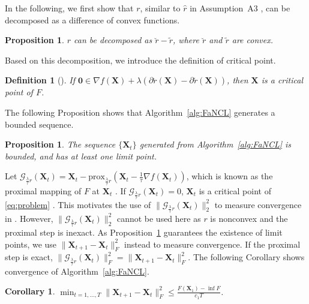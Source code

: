 \documentclass[10pt,journal,compsoc]{IEEEtran}
\newtheorem{prop}[theorem]{Proposition}
\newtheorem{corollary}[theorem]{Corollary}
\newtheorem{definition}{Definition}
\newcommand{\X}{\mathbf{X}}
\newcommand{\NM}[2]{\| #1 \|_{#2} }
\newcommand{\Prox}[2]{\text{prox}_{#1}(#2)}
\begin{document}
In the following, we first
show that $r$,
similar to $\hat{r}$ in Assumption~A3 \cite{gongZLHY2013},
can be decomposed as a difference of convex functions.

\begin{prop} \label{pr:dc}
$r$ can be decomposed as $\breve{r} - \tilde{r}$,
where $\breve{r}$ and $\tilde{r}$ are convex.
\end{prop}

Based on this decomposition, we introduce the definition of critical point.

\begin{definition}
[\!\cite{hiriart85}]
If $\mathbf{0} \in \nabla f(\X) + \lambda \left( \partial \breve{r}(\X) - \partial \tilde{r}(\X) \right) $,
then $\X$ is a {\em critical point} of $F$.
\label{def:crti}
\end{definition}


The following Proposition
shows that Algorithm~\ref{alg:FaNCL} generates a bounded sequence.

\begin{prop} \label{pr:boundseq}
The sequence $\{\X_t\}$ generated from Algorithm~\ref{alg:FaNCL} is bounded,
and has at least one limit point.
\end{prop}

Let $\mathcal{G}_{\frac{\lambda}{\tau} r}(\X_t) = \X_t - \Prox{\frac{\lambda}{\tau}r}{\X_t - \frac{1}{\tau} \nabla f(\X_t)}$,
which is known as the proximal mapping of $F$ at $\X_t$ \cite{parikh2014proximal}.
If $\mathcal{G}_{\frac{\lambda}{\tau} r}(\X_t) = 0$,
$\mathbf{X}_t$ is a critical point of \eqref{eq:problem}
\cite{attouch2013convergence,gongZLHY2013}.
This motivates the use of $\| \mathcal{G}_{\frac{\lambda}{\tau} r}(\X_t) \|_2^2$ to measure convergence 
in \cite{ghadimi2016accelerated}.
However, $\| \mathcal{G}_{\frac{\lambda}{\tau} r}(\X_t) \|_2^2$
cannot be used here as $r$ is nonconvex and the proximal step is inexact.
As 
Proposition~\ref{pr:boundseq}
guarantees
the existence of limit points,
we use $\NM{\X_{t + 1} - \X_t}{F}^2$ instead to measure convergence.
If the proximal step is exact, 
$\| \mathcal{G}_{\frac{\lambda}{\tau} r}(\X_t) \|_F^2 = \| \X_{t + 1} - \X_t \|_F^2$.
The following Corollary
shows convergence of Algorithm~\ref{alg:FaNCL}.

\begin{corollary} \label{cor:rate}
$\min_{t = 1, \dots, T} \NM{\X_{t + 1} - \X_t}{F}^2 \le \frac{F(\X_1) - \inf F}
{c_1 T}$.
\end{corollary}
\end{document}

